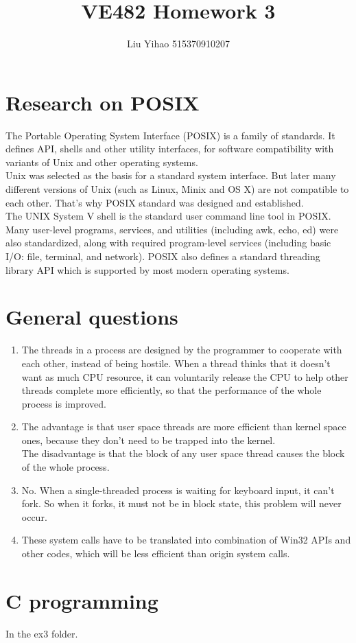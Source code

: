 \documentclass{article}
\title{VE482 Homework 3}
\author{Liu Yihao 515370910207}
\date{}
\begin{document}
\maketitle

\section{Research on POSIX}
The Portable Operating System Interface (POSIX) is a family of standards. It defines API, shells and other utility interfaces, for software compatibility with variants of Unix and other operating systems. \\

Unix was selected as the basis for a standard system interface. But later many different versions of Unix (such as Linux, Minix and OS X) are not compatible to each other. That's why POSIX standard was designed and established. \\

The UNIX System V shell is the standard user command line tool in POSIX. Many user-level programs, services, and utilities (including awk, echo, ed) were also standardized, along with required program-level services (including basic I/O: file, terminal, and network). POSIX also defines a standard threading library API which is supported by most modern operating systems.

\section{General questions}
\begin{enumerate}
\item 
The threads in a process are designed by the programmer to cooperate with each other, instead of being hostile. When a thread thinks that it doesn't want as much CPU resource, it can voluntarily release the CPU to help other threads complete more efficiently, so that the performance of the whole process is improved.
\item
The advantage is that user space threads are more efficient than kernel space ones, because they don't need to be trapped into the kernel. \\
The disadvantage is that the block of any user space thread causes the block of the whole process.
\item
No. When a single-threaded process is waiting for keyboard input, it can't fork. So when it forks, it must not be in block state, this problem will never occur.
\item
These system calls have to be translated into combination of Win32 APIs and other codes, which will be less efficient than origin system calls.
\end{enumerate}

\section{C programming}
In the ex3 folder.
\end{document}
